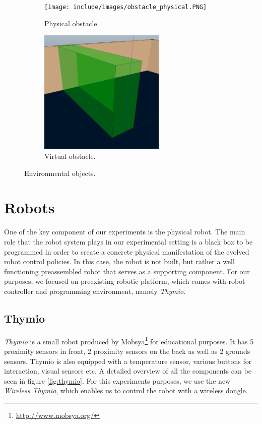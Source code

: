\begin{figure}[h]
    \centering
    \begin{subfigure}[b]{0.4\textwidth}
    	\centering
        \texttt{[image: include/images/obstacle\_physical.PNG]}
        \caption{Physical obstacle.}
        \label{fig:physical_obstacle}
    \end{subfigure}
    \begin{subfigure}[b]{0.4\textwidth}
    	\centering
        \includegraphics[width=6cm]{include/images/obstacle_virtual.PNG}
        \caption{Virtual obstacle.}
        \label{fig:virtual_obstacle}
    \end{subfigure}
    \caption{Environmental objects.}\label{sistemass1}
\end{figure}

\section{Robots}

One of the key component of our experiments is the physical robot. The main role that the robot system plays in our experimental setting is a black box to be programmed in order to create a concrete physical manifestation of the evolved robot control policies. In this case, the robot is not built, but rather a well functioning preassembled robot that serves as a supporting component. For our purposes, we focused on preexisting robotic platform, which comes with robot controller and programming environment, namely \emph{Thymio}.

\subsection{Thymio}

\emph{Thymio} \cite{mondada2017thymio} is a small robot produced by Mobsya\footnote{\url{http://www.mobsya.org/}} for educational purposes. It has 5 proximity sensors in front, 2 proximity sensors on the back as well as 2 grounds sensors. Thymio is also equipped with a temperature sensor, various buttons for interaction, visual sensors etc. A detailed overview of all the components can be seen in figure \ref{fig:thymio}. For this experiments purposes, we use the new \emph{Wireless Thymio}, which enables us to control the robot with a wireless dongle.

